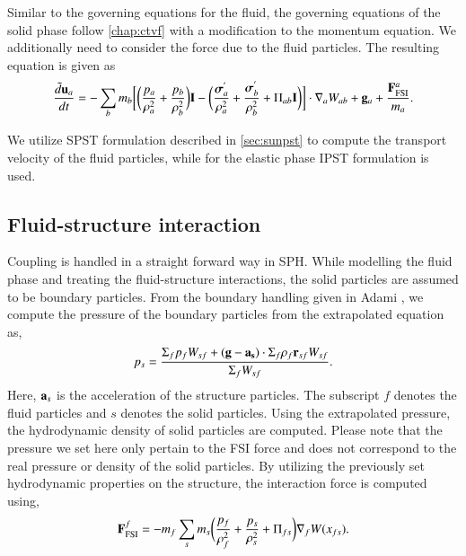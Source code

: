 Similar to the governing equations for the fluid, the governing equations of
the solid phase follow \cref{chap:ctvf} with a modification to the momentum
equation. We additionally need to consider the force due to the
fluid particles. The resulting equation is given as
\begin{multline}
  \label{eq:fsi:sph-momentum-solid}
  \frac{\tilde{d}\mathbf{u}_{a}}{dt} = - \sum_{b} m_b \bigg[
  \bigg(\frac{p_a}{\rho_a^2} + \frac{p_b}{\rho_b^2}\bigg) \mathbf{I} -
  \bigg(\frac{\boldsymbol{\sigma}^{'}_{a}}{\rho_a^2} +
  \frac{\boldsymbol{\sigma}^{'}_{b}}{\rho_b^2} + \Pi_{ab} \mathbf{I} \bigg) \bigg]  \cdot \nabla_{a} W_{ab}
  + \mathbf{g}_{a} + \frac{\mathbf{F}^a_{\text{FSI}}}{m_a}.
\end{multline}

We utilize SPST formulation described in \cref{sec:sunpst} to compute the
transport velocity of the fluid particles, while for the elastic phase
IPST \citep{huang_kernel_2019} formulation is used.

\subsection{Fluid-structure interaction}\label{subsec:fsi}
Coupling is handled in a straight forward way in SPH. While modelling the fluid
phase and treating the fluid-structure interactions, the solid particles are
assumed to be boundary particles. From the boundary handling given in Adami
\citep{Adami2012}, we compute the pressure of the boundary particles from
the extrapolated equation as,
\begin{equation}
  \label{eq:fsi:pressure-bc}
  p_s = \frac{\Sigma_f p_f W_{sf} + (\mathbf{g} - \mathbf{a}_{\mathbf{s}}) \cdot \Sigma_f
    \rho_f \mathbf{r}_{sf} W_{sf}}{\Sigma_f W_{sf}}.
\end{equation}
Here, $\mathbf{a}_s$ is the acceleration of the structure particles. The subscript
$f$ denotes the fluid particles and $s$ denotes the solid particles. Using the
extrapolated pressure, the hydrodynamic density of solid particles are
computed. Please note that the pressure we set here only pertain to the
FSI force and does not correspond to the real pressure or density of the
solid particles. By utilizing the previously set hydrodynamic properties on
the structure, the interaction force is computed using,
\begin{equation}
  \mathbf{F}_{\text{FSI}}^f = -m_f \sum_{s} m_s \bigg(\frac{p_f}{\rho_{f}^2} +
  \frac{p_s}{\rho_{s}^2} + \Pi_{fs} \bigg) \nabla_{f} W(x_{fs}).
\end{equation}


